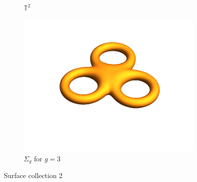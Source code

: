 \begin{figure}
\begin{subfigure}{0.35\textwidth}
    \caption{\(\mathbb{T}^2\)}
\end{subfigure}
\begin{subfigure}{0.35\textwidth}
    \centering
    \includegraphics[width=\textwidth]{picture/week4/torus3.pdf}
    \caption{\(\Sigma_g\) for \(g=3\)}
\end{subfigure}
\caption*{Surface collection 2}
\end{figure}

